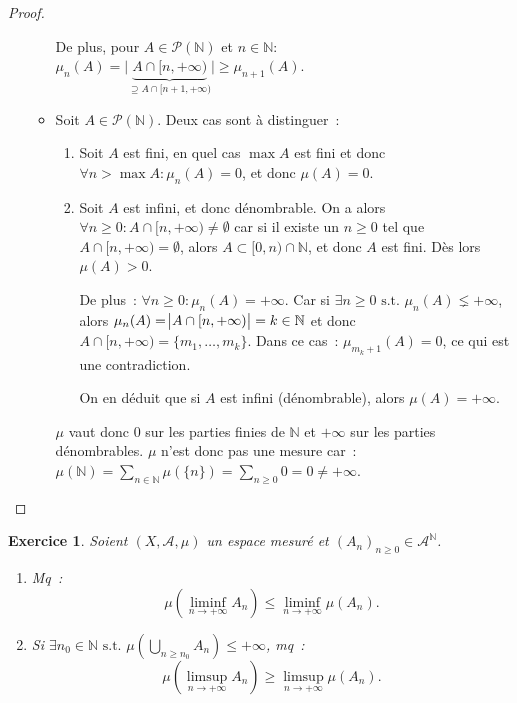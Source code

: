 \documentclass{article}
\newtheorem{ex}{Exercice}[section]
\newcommand{\pinfty}{{+\infty}}
\newcommand{\st}{\text{ s.t. }}
\newcommand{\N}{{\mathbb N}}
\begin{document}
\begin{proof}
\begin{enumerate}
\begin{itemize}
\begin{itemize}
		\end{itemize}
		De plus, pour $A \in \mathcal P(\N)$ et $n \in \N$: $\mu_n(A) = \big|\underbrace  {A \cap [n, \pinfty)}_{\supseteq A \cap [n+1, \pinfty)}\big| \geq \mu_{n+1}(A)$.
		\item Soit $A \in \mathcal P(\N)$. Deux cas sont à distinguer~:
		\begin{enumerate}
			\item Soit $A$ est fini, en quel cas $\max A$ est fini et donc $\forall n > \max A : \mu_n(A) = 0$, et donc $\mu(A) = 0$.
			\item Soit $A$ est infini, et donc dénombrable. On a alors $\forall n \geq 0 : A \cap [n, \pinfty) \neq \emptyset$ car si il existe un $n \geq 0$ tel que
			$A \cap [n, \pinfty) = \emptyset$, alors $A \subset [0, n) \cap \N$, et donc $A$ est fini. Dès lors $\mu(A) > 0$.

			De plus~: $\forall n \geq 0 : \mu_n(A) = \pinfty$. Car si $\exists n \geq 0 \st \mu_n(A) \lneq \pinfty$, alors $\mu_n(A) = \abs {A \cap [n, \pinfty)} = k \in \N$
			et donc $A \cap [n, \pinfty) = \{m_1, \ldots, m_k\}$. Dans ce cas~: $\mu_{m_k+1}(A) = 0$, ce qui est une contradiction.

			On en déduit que si $A$ est infini (dénombrable), alors $\mu(A) = \pinfty$.
		\end{enumerate}
		$\mu$ vaut donc $0$ sur les parties finies de $\N$ et $\pinfty$ sur les parties dénombrables. $\mu$ n'est donc pas une mesure car~:
		$\mu(\N) = \sum_{n \in \N}\mu(\{n\}) = \sum_{n \geq 0}0 = 0 \neq \pinfty$.
	\end{itemize}
\end{enumerate}
\end{proof}

\begin{ex}\label{ex:2.9} Soient $(X, \mathcal A, \mu)$ un espace mesuré et $(A_n)_{n \geq 0} \in {\mathcal A}^\N$.
\begin{enumerate}
	\item Mq~:
	\[\mu\left(\liminf_{n \to \pinfty}A_n\right) \leq \liminf_{n \to \pinfty}\mu(A_n).\]
	\item Si $\exists n_0 \in \N \st \mu\left(\bigcup_{n \geq n_0}A_n\right) \leq \pinfty$, mq~:
	\[\mu\left(\limsup_{n \to \pinfty}A_n\right) \geq \limsup_{n \to \pinfty}\mu(A_n).\]
\end{enumerate}
\end{ex}
\end{document}
